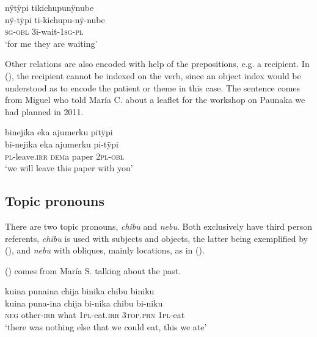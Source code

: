 \ea\label{ex:OBL-pron-2}
\begingl
\glpreamble nÿtÿpi tikichupunÿnube\\
\gla nÿ-tÿpi ti-kichupu-nÿ-nube\\
\textsc{sg}-\textsc{obl} 3i-wait-1\textsc{sg}-\textsc{pl}\\
\glft ‘for me they are waiting’
\endgl
\trailingcitation{[rxx-e181022le.201]}
\xe
{}

Other relations are also encoded with help of the prepositions, e.g. a recipient. In (), the recipient cannot be indexed on the verb, since an object index would be understood as to encode the patient or theme in this case. The sentence comes from Miguel who told María C. about a leaflet for the workshop on Paunaka we had planned in 2011.

\ea\label{ex:OBL-pron-1}
\begingl
\glpreamble binejika eka ajumerku pitÿpi\\
\gla bi-nejika eka ajumerku pi-tÿpi\\
\textsc{pl}-leave.\textsc{irr} \textsc{dem}a paper 2\textsc{pl}-\textsc{obl}\\
\glft ‘we will leave this paper with you’
\endgl
\trailingcitation{[mux-c110810l.011]}
\xe
{}


\subsection{Topic pronouns}\label{sec:FocPron}

There are two topic pronouns, \textit{chibu} and \textit{nebu}. Both exclusively have third person referents, \textit{chibu} is used with subjects and objects, the latter being exemplified by (), and \textit{nebu} with obliques, mainly locations, as in (). 

() comes from María S. talking about the past.

\ea\label{ex:new23-top1}
\begingl
\glpreamble kuina punaina chija binika chibu biniku\\
\gla kuina puna-ina chija bi-nika chibu bi-niku\\
\glb \textsc{neg} other-\textsc{irr} what 1\textsc{pl}-eat.\textsc{irr} 3\textsc{top.prn} 1\textsc{pl}-eat\\
\glft ‘there was nothing else that we could eat, this we ate’
\endgl
\trailingcitation{[rxx-p181101l-2.247]}
\xe

